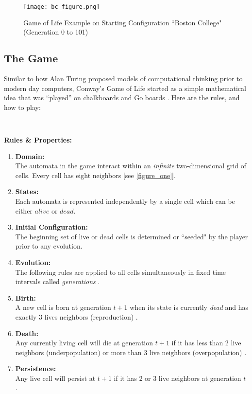 \documentclass{article}
\theoremstyle{definition}
\theoremstyle{plain}
\theoremstyle{plain}
\begin{document}
 \begin{figure}[ht]
          \centering
    \texttt{[image: bc\_figure.png]}
    \caption{Game of Life Example on Starting Configuration ``Boston College" (Generation 0 to 101)}
\end{figure}


\subsection{The Game}
Similar to how Alan Turing proposed models of computational thinking prior to modern day computers, Conway's Game of Life started as a simple mathematical idea that was “played” on chalkboards and Go boards \cite{Izhikevich_Conway_Seth}. Here are the rules, and how to play: 

\

\textbf{Rules \& Properties: }
\begin{enumerate}
  \label{rules}
  \item \textbf{Domain: }\\ The automata in the game interact within an \textit{infinite} two-dimensional grid of cells. Every cell has eight neighbors \cite{Izhikevich_Conway_Seth}[see \ref{figure_one}]. \label{rule_one}

  \item \textbf{States: }\\ Each automata is represented independently by a single cell which can be either $\textit{alive}$ or $\textit{dead}$.

  \item \textbf{Initial Configuration: } \\ The beginning set of live or dead cells is determined or ``seeded" by the player prior to any evolution.

  \item \textbf{Evolution: } \\ The following rules are applied to all cells simultaneously in fixed time intervals called \textit{generations} \cite{Bontes2019}.

  \item \textbf{Birth: } \\ A new cell is born at generation $t + 1$ when its state is currently \textit{dead} and has exactly 3 lives neighbors (reproduction) \cite{Bontes2019}.

  \item \textbf{Death: } \\ Any currently living cell will die at generation $t + 1$ if it has less than 2 live neighbors (underpopulation) or more than 3 live neighbors (overpopulation) \cite{Bontes2019}.

  \item \textbf{Persistence: } \\ Any live cell will persist at $t + 1$ if it has 2 or 3 live neighbors at generation $t$ \cite{Izhikevich_Conway_Seth}.
\end{enumerate}
\end{document}
